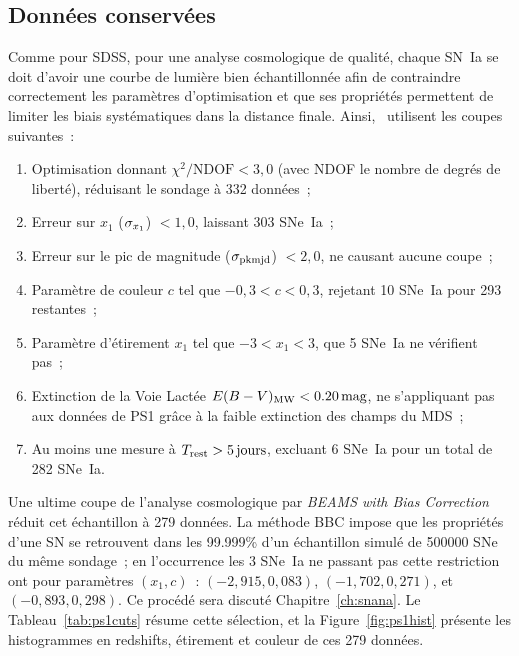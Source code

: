 \documentclass[../main/main.tex]{subfiles}
\begin{document}
\subsection{Données conservées}\label{sec:ps1data}

Comme pour SDSS, pour une analyse cosmologique de qualité, chaque SN~Ia se doit
d'avoir une courbe de lumière bien échantillonnée afin de contraindre
correctement les paramètres d'optimisation et que ses propriétés
permettent de limiter les biais systématiques dans la distance finale.
Ainsi,~\cite{scolnic2018} utilisent les coupes suivantes~:
\begin{enumerate}
    \item Optimisation donnant $\chi^2/\mathrm{NDOF} < 3,0$ (avec NDOF le nombre
        de degrés de liberté), réduisant le sondage à 332 données~;
    \item Erreur sur $x_1$ ($\sigma_{x_1}$) $< 1,0$, laissant 303 SNe~Ia~;
    \item Erreur sur le pic de magnitude ($\sigma_{\rm pkmjd}$) $< 2,0$, ne causant
        aucune coupe~;
    \item Paramètre de couleur $c$ tel que $-0,3 < c < 0,3$, rejetant 10 SNe~Ia
        pour 293 restantes~;
    \item Paramètre d'étirement $x_1$ tel que $-3 < x_1 < 3$, que 5 SNe~Ia ne
        vérifient pas~;
    \item Extinction de la Voie Lactée $E(B-V)_{\rm MW}< \SI{0,20}{mag}$, ne
        s'appliquant pas aux données de PS1 grâce à la faible extinction des
        champs du MDS~;
    \item Au moins une mesure à $T_{\rm rest} > \SI{5}{jours}$, excluant 6
        SNe~Ia pour un total de 282 SNe~Ia.
\end{enumerate}
Une ultime coupe de l'analyse cosmologique par \textit{BEAMS with Bias
Correction} \citep[BBC,][]{kessler2017} réduit cet échantillon à 279 données. La
méthode BBC impose que les propriétés d'une SN se retrouvent dans les 99.999\%
d'un échantillon simulé de \num{500 000} SNe du même sondage~; en l'occurrence
les 3 SNe~Ia ne passant pas cette restriction ont pour paramètres $(x_1,c)$~:
$(−2,915, 0,083)$, $(−1,702, 0,271)$, et $(−0,893, 0,298)$. Ce procédé sera
discuté Chapitre~\ref{ch:snana}. Le Tableau~\ref{tab:ps1cuts} résume cette
sélection, et la Figure~\ref{fig:ps1hist} présente les histogrammes en
redshifts, étirement et couleur de ces 279 données.
\end{document}
